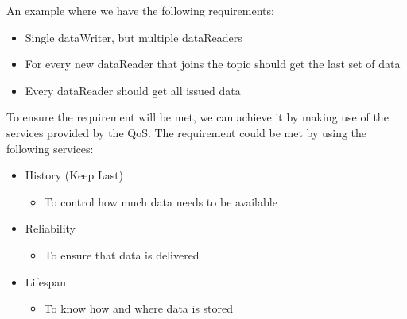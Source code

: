 An example where we have the following requirements:

\begin{itemize}
\item Single dataWriter, but multiple dataReaders
\item For every new dataReader that joins the topic should get the last set of data
\item Every dataReader should get all issued data
\end{itemize}

To ensure the requirement will be met, we can achieve it by making use of the services provided by the QoS. The requirement could be met by using the following services:

\begin{itemize}
\item History (Keep Last)
\begin{itemize}
\item To control how much data needs to be available
\end{itemize}
\item Reliability
\begin{itemize}
\item To ensure that data is delivered
\end{itemize}
\item Lifespan
\begin{itemize}
\item To know how and where data is stored
\end{itemize}
\end{itemize}